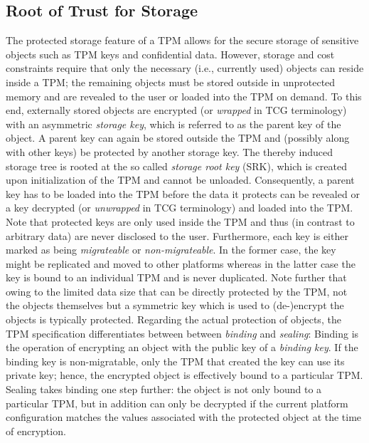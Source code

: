 \documentclass[runningheads]{llncs}
\begin{document}
\subsection{Root of Trust for Storage}
The protected storage feature of a TPM allows for the secure storage of sensitive objects such
as TPM keys and confidential data. However, storage and cost constraints require that only the
necessary (i.e., currently used) objects can reside inside a TPM; the remaining objects must
be stored outside in unprotected memory and are revealed to the user or loaded into the TPM on
demand. To this end, externally stored objects are encrypted (or \emph{wrapped} in TCG terminology)
with an asymmetric \emph{storage key}, which is referred to as the parent key of the object. A
parent key can again be stored outside the TPM and (possibly along with other keys) be protected by
another storage key. The thereby induced storage tree is rooted at the so called \emph{storage root
key} (SRK), which is created upon initialization of the TPM and cannot be unloaded. Consequently,
a parent key has to be loaded into the TPM before the data it protects can be revealed or a key
decrypted (or \emph{unwrapped} in TCG terminology) and loaded into the TPM. Note that protected keys
are only used inside the TPM and thus (in contrast to arbitrary data) are never disclosed to the
user. Furthermore, each key is either marked as being \emph{migrateable} or \emph{non-migrateable}.
In the former case, the key might be replicated and moved to other platforms whereas in the latter
case the key is bound to an individual TPM and is never duplicated. Note further that owing to the
limited data size that can be directly protected by the TPM, not the objects themselves but a
symmetric key which is used to (de-)encrypt the objects is typically protected. Regarding the
actual protection of objects, the TPM specification differentiates between between \emph{binding}
and \emph{sealing}:
Binding is the operation of encrypting an object with the public key of a \emph{binding key}. If
the binding key is non-migratable, only the TPM that created the key can use its private key;
hence, the encrypted object is effectively bound to a particular TPM. Sealing takes binding one
step further: the object is not only bound to a particular TPM, but in addition can only be
decrypted if the current platform configuration matches the values associated with the protected
object at the time of encryption.
\end{document}
